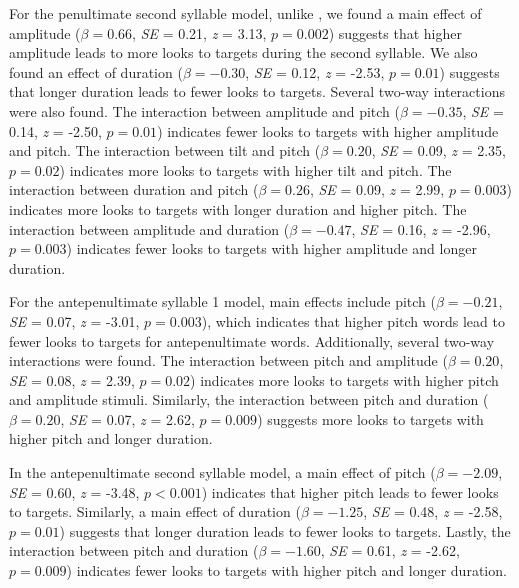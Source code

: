For the penultimate second syllable model, unlike \cite{Sulpizio_McQueen_2012}, we found a main effect of amplitude ($\beta= 0.66$, \textit{SE} = 0.21, \textit{z} = 3.13, $p = 0.002$) suggests that higher amplitude leads to more looks to targets during the second syllable. We also found an effect of duration ($\beta= -0.30$, \textit{SE} = 0.12, \textit{z} = -2.53, $p = 0.01$) suggests that longer duration leads to fewer looks to targets. Several two-way interactions were also found. The interaction between amplitude and pitch ($\beta= -0.35$, \textit{SE} = 0.14, \textit{z} = -2.50, $p = 0.01$) indicates fewer looks to targets with higher amplitude and pitch. The interaction between tilt and pitch ($\beta= 0.20$, \textit{SE} = 0.09, \textit{z} = 2.35, $p = 0.02$) indicates more looks to targets with higher tilt and pitch. The interaction between duration and pitch ($\beta= 0.26$, \textit{SE} = 0.09, \textit{z} = 2.99, $p = 0.003$) indicates more looks to targets with longer duration and higher pitch. The interaction between amplitude and duration ($\beta= -0.47$, \textit{SE} = 0.16, \textit{z} = -2.96, $p = 0.003$) indicates fewer looks to targets with higher amplitude and longer duration.

For the antepenultimate syllable 1 model, main effects include pitch ($\beta= -0.21$, \textit{SE} = 0.07, \textit{z} = -3.01, $p = 0.003$), which indicates that higher pitch words lead to fewer looks to targets for antepenultimate words. Additionally, several two-way interactions were found. The interaction between pitch and amplitude ($\beta= 0.20$, \textit{SE} = 0.08, \textit{z} = 2.39, $p = 0.02$) indicates more looks to targets with higher pitch and amplitude stimuli. Similarly, the interaction between pitch and duration ($\beta= 0.20$, \textit{SE} = 0.07, \textit{z} = 2.62, $p = 0.009$) suggests more looks to targets with higher pitch and longer duration. 

In the antepenultimate second syllable model, a main effect of pitch ($\beta= -2.09$, \textit{SE} = 0.60, \textit{z} = -3.48, $p < 0.001$) indicates that higher pitch leads to fewer looks to targets. Similarly, a main effect of duration ($\beta= -1.25$, \textit{SE} = 0.48, \textit{z} = -2.58, $p = 0.01$) suggests that longer duration leads to fewer looks to targets. Lastly, the interaction between pitch and duration ($\beta= -1.60$, \textit{SE} = 0.61, \textit{z} = -2.62, $p = 0.009$) indicates fewer looks to targets with higher pitch and longer duration.

